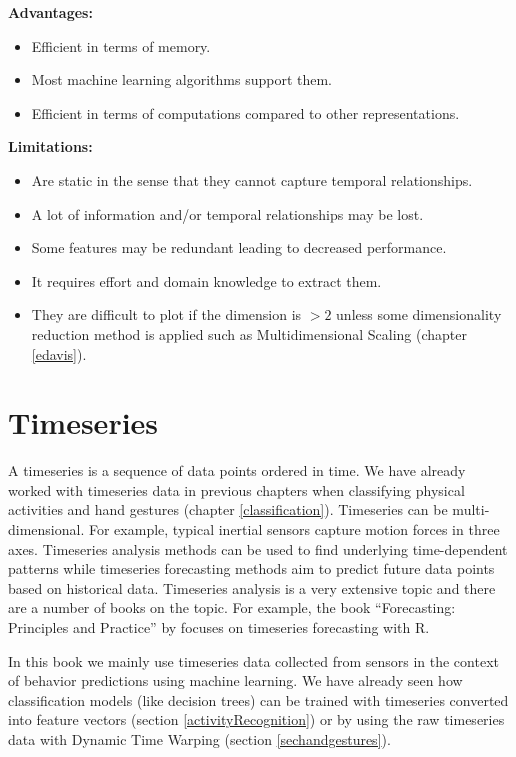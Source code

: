 \documentclass[
  11pt,
]{krantz}
\providecommand{\tightlist}{%
  \setlength{\itemsep}{0pt}\setlength{\parskip}{0pt}}
\begin{document}
\textbf{Advantages:}

\begin{itemize}
\tightlist
\item
  Efficient in terms of memory.
\item
  Most machine learning algorithms support them.
\item
  Efficient in terms of computations compared to other representations.
\end{itemize}

\textbf{Limitations:}

\begin{itemize}
\tightlist
\item
  Are static in the sense that they cannot capture temporal relationships.
\item
  A lot of information and/or temporal relationships may be lost.
\item
  Some features may be redundant leading to decreased performance.
\item
  It requires effort and domain knowledge to extract them.
\item
  They are difficult to plot if the dimension is \(> 2\) unless some dimensionality reduction method is applied such as Multidimensional Scaling (chapter \ref{edavis}).
\end{itemize}

\hypertarget{sectimeseries}{%
\section{Timeseries}\label{sectimeseries}}

A timeseries is a sequence of data points ordered in time. We have already worked with timeseries data in previous chapters when classifying physical activities and hand gestures (chapter \ref{classification}). Timeseries can be multi-dimensional. For example, typical inertial sensors capture motion forces in three axes. Timeseries analysis methods can be used to find underlying time-dependent patterns while timeseries forecasting methods aim to predict future data points based on historical data. Timeseries analysis is a very extensive topic and there are a number of books on the topic. For example, the book ``Forecasting: Principles and Practice'' by \citet{Hyndman2018} focuses on timeseries forecasting with R.

In this book we mainly use timeseries data collected from sensors in the context of behavior predictions using machine learning. We have already seen how classification models (like decision trees) can be trained with timeseries converted into feature vectors (section \ref{activityRecognition}) or by using the raw timeseries data with Dynamic Time Warping (section \ref{sechandgestures}).
\end{document}
